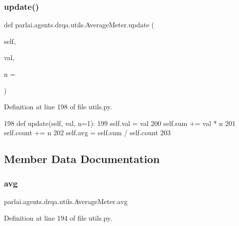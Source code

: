 \subsubsection{\texorpdfstring{update()}{update()}}
{\footnotesize\ttfamily def parlai.\+agents.\+drqa.\+utils.\+Average\+Meter.\+update (\begin{DoxyParamCaption}\item[{}]{self,  }\item[{}]{val,  }\item[{}]{n = {} }\end{DoxyParamCaption})}



Definition at line 198 of file utils.\+py.


\begin{DoxyCode}
198     \textcolor{keyword}{def }update(self, val, n=1):
199         self.val = val
200         self.sum += val * n
201         self.count += n
202         self.avg = self.sum / self.count
203 \end{DoxyCode}


\subsection{Member Data Documentation}
\mbox{\label{classparlai_1_1agents_1_1drqa_1_1utils_1_1AverageMeter_aee254ce04bba670cb5839d0d8b602906}} 
\subsubsection{\texorpdfstring{avg}{avg}}
{\footnotesize\ttfamily parlai.\+agents.\+drqa.\+utils.\+Average\+Meter.\+avg}



Definition at line 194 of file utils.\+py.

\mbox{\label{classparlai_1_1agents_1_1drqa_1_1utils_1_1AverageMeter_a4b3a149e43ba378d8cc4af3885e0c68f}} 
